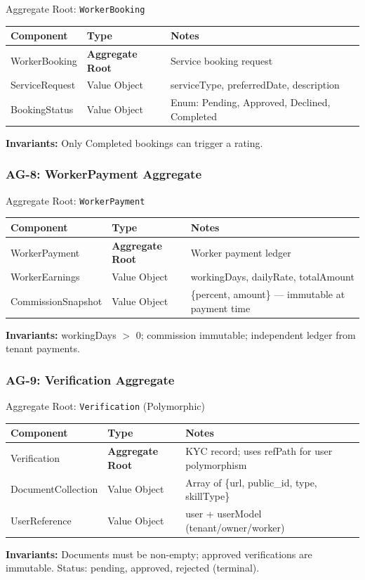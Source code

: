 \documentclass[12pt,a4paper]{article}
\begin{document}
\begin{infobox}{Aggregate Root: \texttt{WorkerBooking}}
\begin{tabular}{@{}p{3cm}p{2.8cm}p{7.8cm}@{}}
\textbf{Component} & \textbf{Type} & \textbf{Notes} \\
\hline
WorkerBooking & \textbf{Aggregate Root} & Service booking request \\
ServiceRequest & Value Object & serviceType, preferredDate, description \\
BookingStatus & Value Object & Enum: Pending, Approved, Declined, Completed \\
\end{tabular}

\textbf{Invariants:} Only Completed bookings can trigger a rating.
\end{infobox}

\subsubsection{AG-8: WorkerPayment Aggregate}

\begin{infobox}{Aggregate Root: \texttt{WorkerPayment}}
\begin{tabular}{@{}p{3cm}p{2.8cm}p{7.8cm}@{}}
\textbf{Component} & \textbf{Type} & \textbf{Notes} \\
\hline
WorkerPayment & \textbf{Aggregate Root} & Worker payment ledger \\
WorkerEarnings & Value Object & workingDays, dailyRate, totalAmount \\
CommissionSnapshot & Value Object & \{percent, amount\} — immutable at payment time \\
\end{tabular}

\textbf{Invariants:} workingDays $>$ 0; commission immutable; independent ledger from tenant payments.
\end{infobox}

\subsubsection{AG-9: Verification Aggregate}

\begin{infobox}{Aggregate Root: \texttt{Verification} (Polymorphic)}
\begin{tabular}{@{}p{3cm}p{2.8cm}p{7.8cm}@{}}
\textbf{Component} & \textbf{Type} & \textbf{Notes} \\
\hline
Verification & \textbf{Aggregate Root} & KYC record; uses refPath for user polymorphism \\
DocumentCollection & Value Object & Array of \{url, public\_id, type, skillType\} \\
UserReference & Value Object & user + userModel (tenant/owner/worker) \\
\end{tabular}

\textbf{Invariants:} Documents must be non-empty; approved verifications are immutable. Status: pending, approved, rejected (terminal).
\end{infobox}
\end{document}
